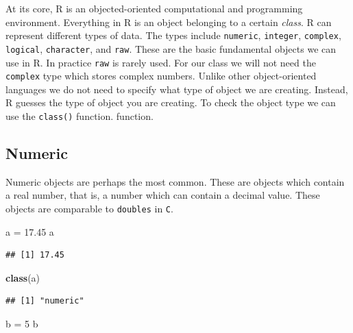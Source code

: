 \documentclass[
]{book}
\newenvironment{Shaded}{\begin{snugshade}}{\end{snugshade}}
\newcommand{\DecValTok}[1]{\textcolor[rgb]{0.00,0.00,0.81}{#1}}
\newcommand{\FloatTok}[1]{\textcolor[rgb]{0.00,0.00,0.81}{#1}}
\newcommand{\KeywordTok}[1]{\textcolor[rgb]{0.13,0.29,0.53}{\textbf{#1}}}
\newcommand{\NormalTok}[1]{#1}
\newcommand{\StringTok}[1]{\textcolor[rgb]{0.31,0.60,0.02}{#1}}
\begin{document}
At its core, R is an objected-oriented computational and programming environment. Everything in R is an object belonging to a certain \emph{class}.
R can represent different types of data. The types include \texttt{numeric}, \texttt{integer}, \texttt{complex}, \texttt{logical}, \texttt{character}, and \texttt{raw}. These are the basic fundamental objects we can use in R. In practice \texttt{raw} is rarely used. For our class we will not need the \texttt{complex} type which stores complex numbers. Unlike other object-oriented languages we do not need to specify what type of object we are creating. Instead, R guesses the type of object you are creating. To check the object type we can use the \texttt{class()} function. function.

\hypertarget{numeric}{%
\subsection*{Numeric}\label{numeric}}

Numeric objects are perhaps the most common. These are objects which contain a real number, that is, a number which can contain a decimal value. These objects are comparable to \texttt{doubles} in \texttt{C}.

\begin{Shaded}
\begin{Highlighting}[]
\NormalTok{a =}\StringTok{ }\FloatTok{17.45}
\NormalTok{a}
\end{Highlighting}
\end{Shaded}

\begin{verbatim}
## [1] 17.45
\end{verbatim}

\begin{Shaded}
\begin{Highlighting}[]
\KeywordTok{class}\NormalTok{(a)}
\end{Highlighting}
\end{Shaded}

\begin{verbatim}
## [1] "numeric"
\end{verbatim}

\begin{Shaded}
\begin{Highlighting}[]
\NormalTok{b =}\StringTok{ }\DecValTok{5}
\NormalTok{b }
\end{Highlighting}
\end{Shaded}
\end{document}
